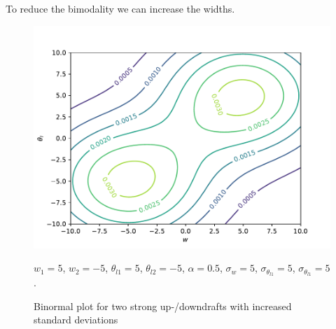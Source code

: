 \documentclass[10pt]{beamer}
\numberwithin{equation}{section}
\begin{document}
    \begin{frame}
        \begin{large}
            To reduce the bimodality we can increase the widths.
        \end{large}
        \begin{figure}[!htb]
            \centering
            \includegraphics[width=.5\textwidth]{include/figures/plot2}
            \caption{Binormal plot for two strong up-/downdrafts with increased standard deviations}
            \label{fig:plot2}
            $w_1 = 5$, $w_2 = -5$, $\theta_{l1} = 5$, $\theta_{l2} = -5$,
            $\alpha = 0.5$, $\sigma_w = 5$, $\sigma_{\theta_{l1}} = 5$, $\sigma_{\theta_{l1}} = 5$.
        \end{figure}
    \end{frame}
\end{document}
